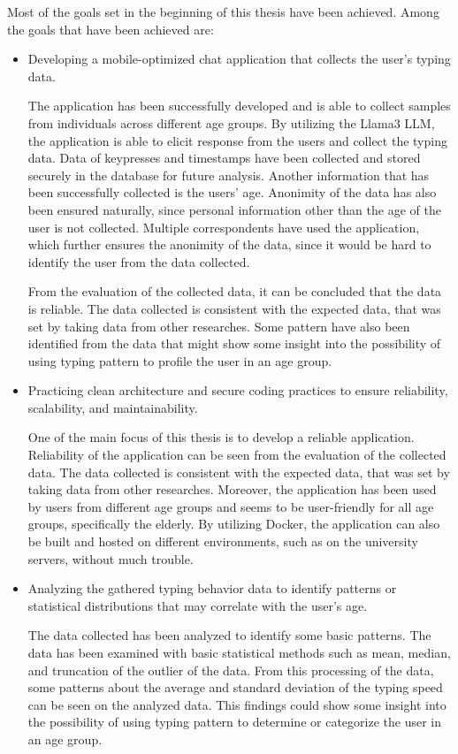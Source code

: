Most of the goals set in the beginning of this thesis have been achieved.
Among the goals that have been achieved are:
\begin{itemize}
    \item Developing a mobile-optimized chat application that collects the user's typing data.
    
    The application has been successfully developed and is able to collect samples from individuals across different age groups.
    By utilizing the Llama3 \ac{LLM}, the application is able to elicit response from the users and collect the typing data.
    Data of keypresses and timestamps have been collected and stored securely in the database for future analysis.
    Another information that has been successfully collected is the users' age.
    Anonimity of the data has also been ensured naturally, since personal information other than the age of the user is not collected.
    Multiple correspondents have used the application, which further ensures the anonimity of the data, since it would be hard to identify the user from the data collected.

    From the evaluation of the collected data, it can be concluded that the data is reliable.
    The data collected is consistent with the expected data, that was set by taking data from other researches.
    Some pattern have also been identified from the data that might show some insight into the possibility of using typing pattern to profile the user in an age group.

    \item Practicing clean architecture and secure coding practices to ensure reliability, scalability, and maintainability.
    
    One of the main focus of this thesis is to develop a reliable application.
    Reliability of the application can be seen from the evaluation of the collected data.
    The data collected is consistent with the expected data, that was set by taking data from other researches.
    Moreover, the application has been used by users from different age groups and seems to be user-friendly for all age groups, specifically the elderly.
    By utilizing Docker, the application can also be built and hosted on different environments, such as on the university servers, without much trouble.

    \item Analyzing the gathered typing behavior data to identify patterns or statistical distributions that may correlate with the user's age.
    
    The data collected has been analyzed to identify some basic patterns.
    The data has been examined with basic statistical methods such as mean, median, and truncation of the outlier of the data.	
    From this processing of the data, some patterns about the average and standard deviation of the typing speed can be seen on the analyzed data.
    This findings could show some insight into the possibility of using typing pattern to determine or categorize the user in an age group.

\end{itemize}

